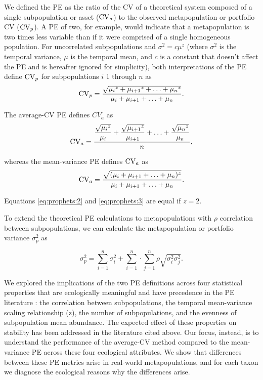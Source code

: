 We defined the PE as the ratio of the CV of a theoretical system composed of a
single subpopulation or asset ($\mathrm{CV}_a$) to the observed metapopulation or
portfolio CV ($\mathrm{CV}_p$). A PE of two, for example, would indicate that a
metapopulation is two times less variable than if it were comprised of a single
homogeneous population. For uncorrelated subpopulations and $\sigma^2 = c
\mu^z$ (where $\sigma^2$ is the temporal variance, $\mu$ is the temporal mean,
and $c$ is a constant that doesn't affect the PE and is hereafter ignored for
simplicity), both interpretations of the PE define $\mathrm{CV}_p$ for subpopulations
$i$ 1 through $n$ as
\begin{equation}
\mathrm{CV}_p = \dfrac{\sqrt{{\mu_i}^z + {\mu_{i+1}}^z + \ldots + {\mu_n}^z}}{\mu_i +
\mu_{i+1} + \ldots + \mu_n}.
\label{eq:prophets:1}
\end{equation}

\noindent The average-CV PE defines $CV_a$ as
\begin{equation}
\mathrm{CV}_a = \dfrac{\dfrac{\sqrt{{\mu_i}^z}}{\mu_i} +
\dfrac{\sqrt{{\mu_{i+1}}^z}}{\mu_{i+1}} + \ldots +
\dfrac{\sqrt{{\mu_n}^z}}{\mu_n}}{n},
\label{eq:prophets:2}
\end{equation}

\noindent whereas the mean-variance PE defines $\mathrm{CV}_a$ as
\begin{equation}
\mathrm{CV}_a = \dfrac{\sqrt{(\mu_i + \mu_{i+1} + \ldots + \mu_n)^z}}{\mu_i +
\mu_{i+1} + \ldots + \mu_n}.
\label{eq:prophets:3}
\end{equation}

\noindent Equations \ref{eq:prophets:2} and \ref{eq:prophets:3} are equal if $z = 2$.

To extend the theoretical PE calculations to metapopulations with $\rho$
correlation between subpopulations, we can calculate the metapopulation or
portfolio variance $\sigma^2_p$ as

\begin{equation}
 \sigma^2_p = \sum_{i =1}^n \sigma^2_i + \sum_{i =1}^n \cdot \sum_{j =1}^n \rho \sqrt{\sigma^2_i \sigma^2_j}.
\end{equation}

We explored the implications of the two PE definitions across four statistical
properties that are ecologically meaningful and have precedence in the PE
literature \citep{tilman1999, cottingham2001, loreau2010a,
thibaut2013}: the correlation between subpopulations, the temporal
mean-variance scaling relationship (z), the number of subpopulations, and the
evenness of subpopulation mean abundance. The expected effect of these
properties on  stability
has been addressed in the literature cited
above. Our focus, instead, is to understand the performance of the average-CV
method compared to the mean-variance PE across these four ecological
attributes. We show that differences between these PE metrics arise in
real-world metapopulations, and for each taxon we diagnose the ecological
reasons why the differences arise.

